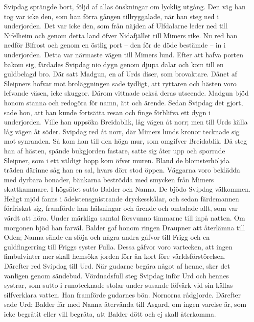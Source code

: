 Svipdag sprängde bort, följd af allas önskningar om lycklig utgång. Den
väg han tog var icke den, som han förra gången tillryggalade, när han
steg ned i underjorden. Det var icke den, som från näjden af Ulfdalarne
leder ned till Nifelheim och genom detta land öfver Nidafjället till
Mimers rike. Nu red han nedför Bifrost och genom en östlig port -- den
för de döde bestämde -- in i underjorden. Detta var närmaste
vägen till Mimers lund. Efter att hafva porten bakom sig, färdades
Svipdag nio dygn genom djupa dalar och kom till en guldbelagd bro. Där
satt Madgun, en af Urds diser, som brovaktare. Dånet af Sleipners hofvar
mot broläggningen sade tydligt, att ryttaren och hästen voro lefvande
väsen, icke skuggor. Därom vittnade också deras utseende. Madgun bjöd
honom stanna och redogöra för namn, ätt och ärende. Sedan Svipdag det
gjort, sade hon, att han kunde fortsätta resan och finge förblifva ett
dygn i underjorden. Ville han uppsöka Breidablik, låg vägen åt norr; men
till Urds källa låg vägen åt söder. Svipdag red åt norr, där Mimers
lunds kronor tecknade sig mot synranden. Så kom han till den höga mur,
som omgifver Breidablik. Då steg han af hästen, spände bukgjorden
fastare, satte sig åter upp och sporrade Sleipner, som i ett väldigt
hopp kom öfver muren. Bland de blomsterhöljda träden därinne såg han en
sal, hvars dörr stod öppen. Väggarna voro beklädda med dyrbara bonader,
bänkarna beströdda med smycken från Mimers skattkammare. I högsätet
sutto Balder och Nanna. De bjödo Svipdag välkommen. Heligt mjöd fanns i
ädelstensgnistrande dryckesskålar, och sedan färdemannen förfriskat sig,
framförde han hälsningar och ärende och omtalade allt, som var värdt att
höra. Under märkliga samtal försvunno timmarne till inpå natten. Om
morgonen bjöd han farväl. Balder gaf honom ringen Draupner att återlämna
till Oden; Nanna sände en slöja och några andra gåfvor till Frigg och en
guldfingerring till Friggs syster Fulla. Dessa gåfvor voro vartecken,
att ingen fimbulvinter mer skall hemsöka jorden förr än kort före
världsförstörelsen. Därefter red Svipdag till Urd. När gudarne begära
något af henne, sker det vanligen genom sändebud. Vördnadsfull steg
Svipdag inför Urd och hennes systrar, som sutto i runotecknade stolar
under susande löfvärk vid sin källas silfverklara vatten. Han framförde
gudarnes bön. Nornorna rådgjorde. Därefter sade Urd: Balder får med
Nanna återvända till Asgard, om ingen varelse är, som icke begråtit
eller vill begråta, att Balder dött och ej skall återkomma.

